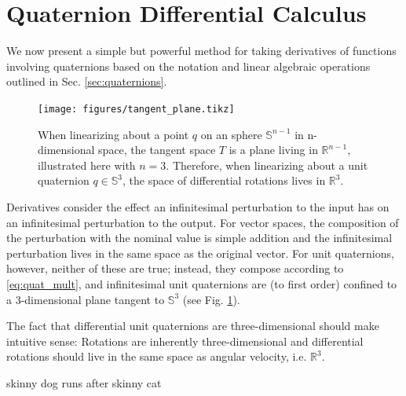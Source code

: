 \documentclass[letterpaper, 10 pt, conference]{ieeeconf}  %
\newcommand{\R}{\mathbb{R}}
\newcommand{\Q}{\mathbb{S}^3}
\begin{document}
\section{Quaternion Differential Calculus} \label{sec:Quaternion_Calculus}
    We now present a simple but powerful method for taking derivatives of functions 
    involving quaternions based on the notation and linear algebraic operations outlined 
    in Sec. \ref{sec:quaternions}.
    
    \begin{figure}
        \centering
        \texttt{[image: figures/tangent\_plane.tikz]}
        \caption{
            When linearizing about a point $q$ on an sphere $\mathbb{S}^{n-1}$ in 
            n-dimensional space, the tangent space $T$ is a plane living in $\R^{n-1}$, 
            illustrated here with $n=3$. Therefore, when linearizing about a unit 
            quaternion $q \in \Q$, the space of differential rotations lives in $\R^3$.
        }
        \label{fig:tangent_plane}
    \end{figure}
        
        Derivatives consider the effect an infinitesimal perturbation to the input has on
        an infinitesimal perturbation to the output. For vector spaces, the composition
        of the perturbation with the nominal value is simple addition and the
        infinitesimal perturbation lives in the same space as the original vector. For
        unit quaternions, however, neither of these are true; instead, they compose
        according to \eqref{eq:quat_mult}, and infinitesimal unit quaternions are (to
        first order) confined to a 3-dimensional plane tangent to $\Q$ (see Fig.
        \ref{fig:tangent_plane}).

        The fact that differential unit quaternions are three-dimensional should make
        intuitive sense: Rotations are inherently three-dimensional and differential
        rotations should live in the same space as angular velocity, i.e. $\R^3$.

        skinny dog runs after skinny cat
        
\end{document}
